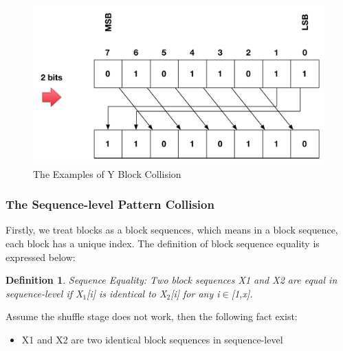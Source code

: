 \documentclass{article}
\newtheorem{defination}{Definition}[section]
\begin{document}
\begin{figure}
{\begin{minipage}[b]{0.45\textwidth}
\includegraphics[width=1\textwidth]{./diagrams/r_d_2bits.pdf}
\end{minipage}
}
 \caption{The Examples of Y Block Collision}
 \label{fig: Y-blk-collision}
\end{figure}
\subsubsection{The Sequence-level Pattern Collision}
Firstly, we treat blocks as a block sequences, which means in a block sequence, each block has a unique index. The definition of block sequence equality is expressed below:
\begin{defination}
Sequence Equality: Two block sequences X1 and X2 are equal in sequence-level if X$_1$[i] is identical to X$_2$[i] for any i$\in$[1,x].
\end{defination}

Assume the shuffle stage does not work, then the following fact exist:
\begin{itemize}
	\item X1 and X2 are two identical block sequences in sequence-level
\end{itemize}
\end{document}
